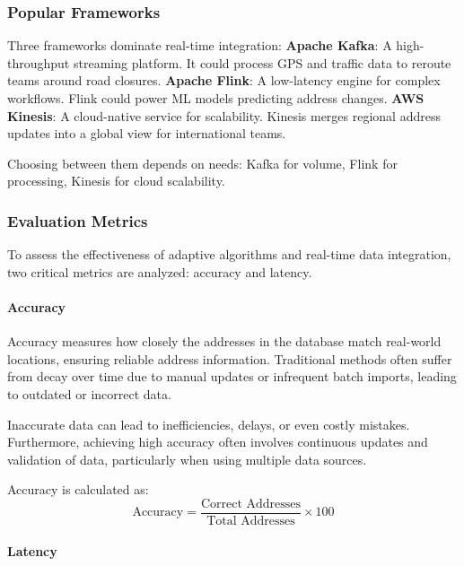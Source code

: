         \subsubsection{Popular Frameworks}

        Three frameworks dominate real-time integration: \blankLine
        \textbf{Apache Kafka}: A high-throughput streaming platform. It could process GPS and traffic data to reroute teams around road closures.\blankLine
        \textbf{Apache Flink}: A low-latency engine for complex workflows. Flink could power ML models predicting address changes.\blankLine
        \textbf{AWS Kinesis}: A cloud-native service for scalability. Kinesis merges regional address updates into a global view for international teams.\blankLine
        
        Choosing between them depends on needs: Kafka for volume, Flink for processing, Kinesis for cloud scalability. \autocite{Ranjbary2024Sep}


        \subsubsection{Evaluation Metrics}
        \label{sec:evaluation-metrics}

        To assess the effectiveness of adaptive algorithms and real-time data integration, two critical metrics are analyzed: accuracy and latency.

        \paragraph{Accuracy}
        \label{par:accuracy}

        Accuracy measures how closely the addresses in the database match real-world locations, ensuring reliable address information. Traditional methods often suffer from decay over time due to manual updates or infrequent batch imports, leading to outdated or incorrect data.  \blankLine

        Inaccurate data can lead to inefficiencies, delays, or even costly mistakes. Furthermore, achieving high accuracy often involves continuous updates and validation of data, particularly when using multiple data sources. \autocite{GeeksforGeeks2024Oct}\blankLine

        Accuracy is calculated as:
        \[
        \text{Accuracy} = \frac{\text{Correct Addresses}}{\text{Total Addresses}} \times 100
        \]
    

        \paragraph{Latency}
        \label{par:latency}

